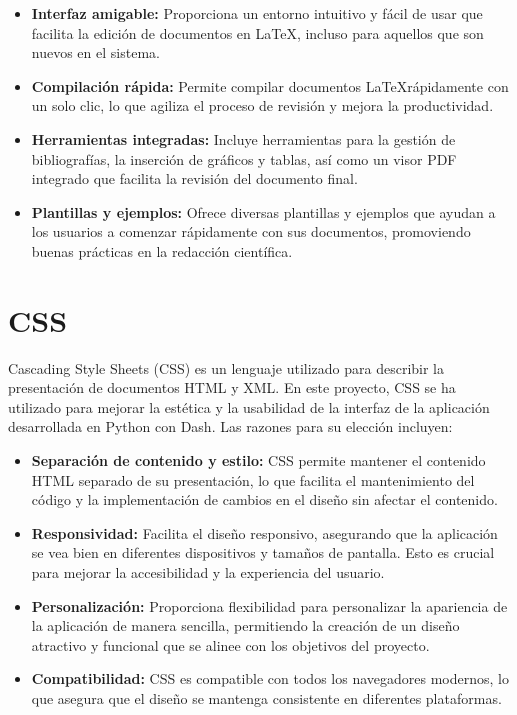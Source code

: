\begin{itemize}
    \item \textbf{Interfaz amigable:} Proporciona un entorno intuitivo y fácil de usar que facilita la edición de documentos en \LaTeX, incluso para aquellos que son nuevos en el sistema.
    \item \textbf{Compilación rápida:} Permite compilar documentos \LaTeX rápidamente con un solo clic, lo que agiliza el proceso de revisión y mejora la productividad.
    \item \textbf{Herramientas integradas:} Incluye herramientas para la gestión de bibliografías, la inserción de gráficos y tablas, así como un visor PDF integrado que facilita la revisión del documento final.
    \item \textbf{Plantillas y ejemplos:} Ofrece diversas plantillas y ejemplos que ayudan a los usuarios a comenzar rápidamente con sus documentos, promoviendo buenas prácticas en la redacción científica.
\end{itemize}

\section{CSS}
Cascading Style Sheets (CSS) es un lenguaje utilizado para describir la presentación de documentos HTML y XML. En este proyecto, CSS se ha utilizado para mejorar la estética y la usabilidad de la interfaz de la aplicación desarrollada en Python con Dash. Las razones para su elección incluyen:

\begin{itemize}
    \item \textbf{Separación de contenido y estilo:} CSS permite mantener el contenido HTML separado de su presentación, lo que facilita el mantenimiento del código y la implementación de cambios en el diseño sin afectar el contenido.
    \item \textbf{Responsividad:} Facilita el diseño responsivo, asegurando que la aplicación se vea bien en diferentes dispositivos y tamaños de pantalla. Esto es crucial para mejorar la accesibilidad y la experiencia del usuario.
    \item \textbf{Personalización:} Proporciona flexibilidad para personalizar la apariencia de la aplicación de manera sencilla, permitiendo la creación de un diseño atractivo y funcional que se alinee con los objetivos del proyecto.
    \item \textbf{Compatibilidad:} CSS es compatible con todos los navegadores modernos, lo que asegura que el diseño se mantenga consistente en diferentes plataformas.
\end{itemize}

